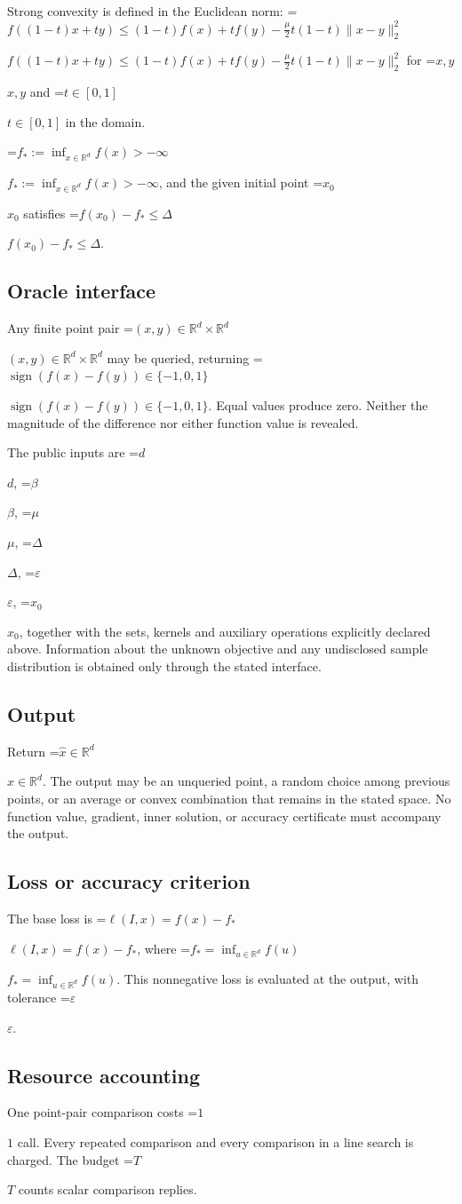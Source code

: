 \documentclass[10pt,a4paper]{article}
\newcommand{\AtlasMath}[1]{\par\begingroup\centering\setbox0=\hbox{$\displaystyle #1$}\ifdim\wd0>1.4\linewidth\typeout{ATLAS WIDE FORMULA: \the\wd0}\fi\ifdim\wd0>\linewidth\resizebox{\linewidth}{!}{\box0}\else\box0\fi\par\endgroup}
\newcommand{\AtlasInlineMath}[1]{\begingroup\setbox0=\hbox{$#1$}\ifdim\wd0>.4\linewidth\endgroup\AtlasMath{#1}\else\endgroup$#1$\fi}
\begin{document}
Strong convexity is defined in the Euclidean norm: \AtlasInlineMath{f((1-t)x+ty)\le(1-t)f(x)+tf(y)-\frac{\mu}{2}t(1-t)\|x-y\|_2^2} for \AtlasInlineMath{x,y} and \AtlasInlineMath{t\in[0,1]} in the domain.

\AtlasInlineMath{f_*:=\inf_{x\in\mathbb{R}^d}f(x)>-\infty}, and the given initial point \AtlasInlineMath{x_0} satisfies \AtlasInlineMath{f(x_0)-f_*\le\Delta}.

\subsection{Oracle interface}
Any finite point pair \AtlasInlineMath{(x,y)\in\mathbb{R}^d\times\mathbb{R}^d} may be queried, returning \AtlasInlineMath{\operatorname{sign}(f(x)-f(y))\in\{-1,0,1\}}. Equal values produce zero. Neither the magnitude of the difference nor either function value is revealed.

The public inputs are \AtlasInlineMath{d}, \AtlasInlineMath{\beta}, \AtlasInlineMath{\mu}, \AtlasInlineMath{\Delta}, \AtlasInlineMath{\varepsilon}, \AtlasInlineMath{x_0}, together with the sets, kernels and auxiliary operations explicitly declared above. Information about the unknown objective and any undisclosed sample distribution is obtained only through the stated interface.

\subsection{Output}
Return \AtlasInlineMath{\widehat{x}\in \mathbb{R}^d}. The output may be an unqueried point, a random choice among previous points, or an average or convex combination that remains in the stated space. No function value, gradient, inner solution, or accuracy certificate must accompany the output.

\subsection{Loss or accuracy criterion}
The base loss is \AtlasInlineMath{\ell(I,x)=f(x)-f_*}, where \AtlasInlineMath{f_*=\inf_{u\in \mathbb{R}^d}f(u)}. This nonnegative loss is evaluated at the output, with tolerance \AtlasInlineMath{\varepsilon}.

\subsection{Resource accounting}
One point-pair comparison costs \AtlasInlineMath{1} call. Every repeated comparison and every comparison in a line search is charged. The budget \AtlasInlineMath{T} counts scalar comparison replies.
\end{document}
